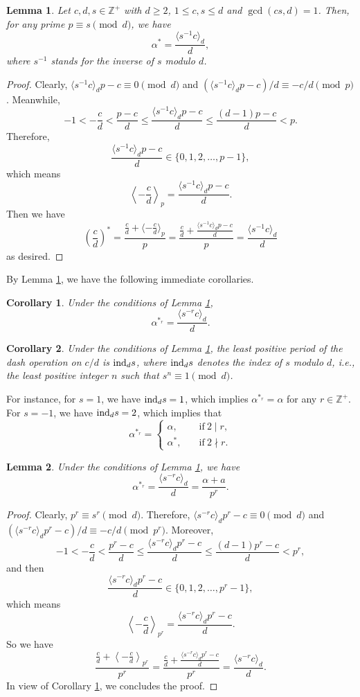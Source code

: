 \documentclass[12pt,reqno]{amsart}
\def\l{\left}
\def\r{\right}
\def\t{\text}
\def\f{\frac}
\def\ind{{\rm ind}}
\def\eq{\equiv}
\def\Z{\mathbb Z}
\def\<{\langle}
\def\>{\rangle}
\theoremstyle{plain}
\newtheorem{lemma}{Lemma}[section]
\newtheorem{corollary}{Corollary}[section]
\theoremstyle{definition}
\theoremstyle{remark}
\numberwithin{equation}{section}
\begin{document}
\begin{lemma}\label{dashres}
Let $c,d,s\in\Z^+$ with $d\geq2$, $1\leq c,s\leq d$ and $\gcd(cs,d)=1$. Then, for any prime $p\eq s\pmod{d}$, we have
$$
\alpha^{\ast}=\f{\<s^{-1}c\>_d}{d},
$$
where $s^{-1}$ stands for the inverse of $s$ modulo $d$.
\end{lemma}

\begin{proof}
Clearly, $\<s^{-1}c\>_dp-c\eq 0\pmod{d}$ and $(\<s^{-1}c\>_dp-c)/d\eq -c/d\pmod{p}$. Meanwhile,
$$
-1<-\f{c}{d}<\f{p-c}{d}\leq\f{\<s^{-1}c\>_dp-c}{d}\leq \f{(d-1)p-c}{d}<p.
$$
Therefore,
$$
\f{\<s^{-1}c\>_dp-c}{d}\in\{0,1,2,\ldots,p-1\},
$$
which means
$$
\l\<-\f{c}{d}\r\>_p=\f{\<s^{-1}c\>_dp-c}{d}.
$$
Then we have
$$
\l(\f{c}{d}\r)^{\ast}=\f{\f{c}{d}+\<-\f{c}{d}\>_p}{p}=\f{\f{c}{d}+\f{\<s^{-1}c\>_dp-c}{d}}{p}=\f{\<s^{-1}c\>_d}{d}
$$
as desired.
\end{proof}

By Lemma \ref{dashres}, we have the following immediate corollaries.

\begin{corollary}\label{dashrep}
Under the conditions of Lemma \ref{dashres},
$$
\alpha^{\ast_r}=\f{\<s^{-r}c\>_d}{d}.
$$
\end{corollary}

\begin{corollary}\label{dashper}
Under the conditions of Lemma \ref{dashres}, the least positive period of the dash operation on $c/d$ is $\ind_ds$, where $\ind_ds$ denotes the index of $s$ modulo $d$, i.e., the least positive integer $n$ such that $s^n\eq1\pmod{d}$.
\end{corollary}

For instance, for $s=1$, we have $\ind_ds=1$, which implies $\alpha^{\ast_r}=\alpha$ for any $r\in\Z^+$. For $s=-1$, we have $\ind_ds=2$, which implies that
$$
\alpha^{\ast_r}=\begin{cases}\alpha,\quad&\t{if}\ 2\mid r,\\ \alpha^{\ast},\quad&\t{if}\ 2\nmid r.\end{cases}
$$

\begin{lemma}\label{u}
Under the conditions of Lemma \ref{dashres}, we have
$$
\alpha^{\ast_r}=\f{\<s^{-r}c\>_d}{d}=\f{\alpha+a}{p^r}.
$$
\end{lemma}

\begin{proof}
Clearly, $p^r\eq s^r\pmod{d}$. Therefore, $\<s^{-r}c\>_dp^r-c\eq0\pmod{d}$ and $(\<s^{-r}c\>_dp^r-c)/d\eq-c/d\pmod{p^r}$. Moreover,
$$
-1<-\f{c}{d}<\f{p^r-c}{d}\leq\f{\<s^{-r}c\>_dp^r-c}{d}\leq\f{(d-1)p^r-c}{d}<p^r,
$$
and then
$$
\f{\<s^{-r}c\>_dp^r-c}{d}\in\{0,1,2,\ldots,p^r-1\},
$$
which means
$$
\l\<-\f{c}{d}\r\>_{p^r}=\f{\<s^{-r}c\>_dp^r-c}{d}.
$$
So we have
$$
\f{\f{c}{d}+\l\<-\f{c}{d}\r\>_{p^r}}{p^r}=\f{\f{c}{d}+\f{\<s^{-r}c\>_dp^r-c}{d}}{p^r}=\f{\<s^{-r}c\>_d}{d}.
$$
In view of Corollary \ref{dashrep}, we concludes the proof.
\end{proof}
\end{document}
